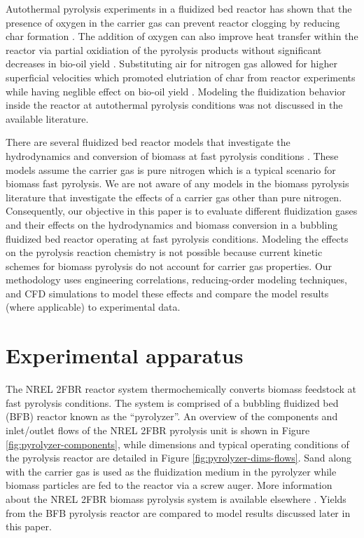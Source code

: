 \documentclass{article}
\begin{document}
Autothermal pyrolysis experiments in a fluidized bed reactor has shown that the presence of oxygen in the carrier gas can prevent reactor clogging by reducing char formation \cite{Kim-2014}. The addition of oxygen can also improve heat transfer within the reactor via partial oxidiation of the pyrolysis products without significant decreases in bio-oil yield \cite{Polin-2019a, Oyedeji-2022}. Substituting air for nitrogen gas allowed for higher superficial velocities which promoted elutriation of char from reactor experiments while having neglible effect on bio-oil yield \cite{Polin-2019b}. Modeling the fluidization behavior inside the reactor at autothermal pyrolysis conditions was not discussed in the available literature.

There are several fluidized bed reactor models that investigate the hydrodynamics and conversion of biomass at fast pyrolysis conditions \cite{Papadikis-2009, Papadikis-2010, Mellin-2014, Xiong-2016, Xue-2011}. These models assume the carrier gas is pure nitrogen which is a typical scenario for biomass fast pyrolysis. We are not aware of any models in the biomass pyrolysis literature that investigate the effects of a carrier gas other than pure nitrogen. Consequently, our objective in this paper is to evaluate different fluidization gases and their effects on the hydrodynamics and biomass conversion in a bubbling fluidized bed reactor operating at fast pyrolysis conditions. Modeling the effects on the pyrolysis reaction chemistry is not possible because current kinetic schemes for biomass pyrolysis do not account for carrier gas properties. Our methodology uses engineering correlations, reducing-order modeling techniques, and CFD simulations to model these effects and compare the model results (where applicable) to experimental data.


\section{Experimental apparatus}

The NREL 2FBR reactor system thermochemically converts biomass feedstock at fast pyrolysis conditions. The system is comprised of a bubbling fluidized bed (BFB) reactor known as the ``pyrolyzer''. An overview of the components and inlet/outlet flows of the NREL 2FBR pyrolysis unit is shown in Figure \ref{fig:pyrolyzer-components}, while dimensions and typical operating conditions of the pyrolysis reactor are detailed in Figure \ref{fig:pyrolyzer-dims-flows}. Sand along with the carrier gas is used as the fluidization medium in the pyrolyzer while biomass particles are fed to the reactor via a screw auger. More information about the NREL 2FBR biomass pyrolysis system is available elsewhere \cite{Howe-2015, Trendewicz-2015}. Yields from the BFB pyrolysis reactor are compared to model results discussed later in this paper.
\end{document}
